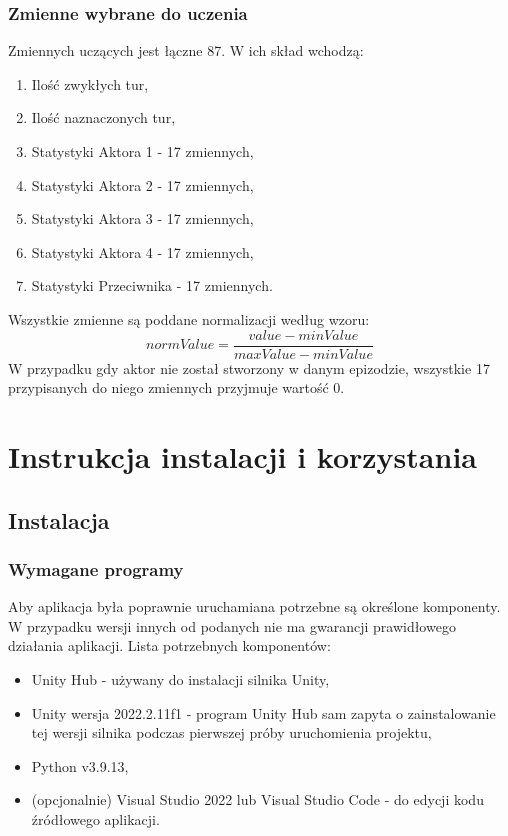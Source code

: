 \documentclass{SGGW-thesis}
\begin{document}
\subsection{Zmienne wybrane do uczenia}
Zmiennych uczących jest łączne 87. W ich skład wchodzą:
\begin{enumerate}
  \item{Ilość zwykłych tur},
  \item{Ilość naznaczonych tur},
  \item{Statystyki Aktora 1 - 17 zmiennych},
  \item{Statystyki Aktora 2 - 17 zmiennych},
  \item{Statystyki Aktora 3 - 17 zmiennych},
  \item{Statystyki Aktora 4 - 17 zmiennych},
  \item{Statystyki Przeciwnika - 17 zmiennych}.
\end{enumerate}
Wszystkie zmienne są poddane normalizacji według wzoru:
\[normValue = \frac{value-minValue}{maxValue-minValue}\]
W przypadku gdy aktor nie został stworzony w danym epizodzie, wszystkie 17 przypisanych do niego zmiennych przyjmuje wartość 0.

\chapter{Instrukcja instalacji i korzystania}
\section{Instalacja}
\subsection{Wymagane programy}
Aby aplikacja była poprawnie uruchamiana potrzebne są określone komponenty. W przypadku wersji innych od podanych nie ma gwarancji prawidłowego działania aplikacji.
Lista potrzebnych komponentów:
\begin{itemize}
  \item{Unity Hub - używany do instalacji silnika Unity},
  \item{Unity wersja 2022.2.11f1 - program Unity Hub sam zapyta o zainstalowanie tej wersji silnika podczas pierwszej próby uruchomienia projektu},
  \item{Python v3.9.13},
  \item{(opcjonalnie) Visual Studio 2022 lub Visual Studio Code - do edycji kodu źródłowego aplikacji}.
\end{itemize}
\end{document}
